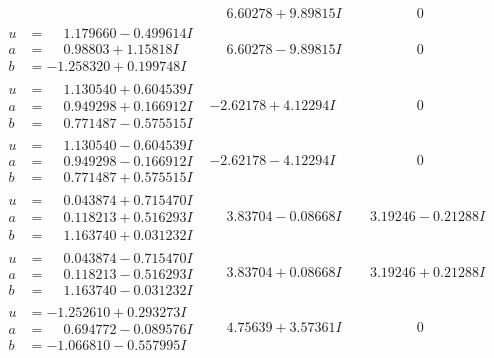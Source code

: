 \documentclass[1p]{elsarticle_modified}
\theoremstyle{definition}
\begin{document}
$$\begin{array}{c|c|c}
 & \phantom{-}6.60278 + 9.89815 I & \phantom{-0.000000 } 0 \\ \hline\begin{aligned}
u &= \phantom{-}1.179660 - 0.499614 I \\
a &= \phantom{-}0.98803 + 1.15818 I \\
b &= -1.258320 + 0.199748 I\end{aligned}
 & \phantom{-}6.60278 - 9.89815 I & \phantom{-0.000000 } 0 \\ \hline\begin{aligned}
u &= \phantom{-}1.130540 + 0.604539 I \\
a &= \phantom{-}0.949298 + 0.166912 I \\
b &= \phantom{-}0.771487 - 0.575515 I\end{aligned}
 & -2.62178 + 4.12294 I & \phantom{-0.000000 } 0 \\ \hline\begin{aligned}
u &= \phantom{-}1.130540 - 0.604539 I \\
a &= \phantom{-}0.949298 - 0.166912 I \\
b &= \phantom{-}0.771487 + 0.575515 I\end{aligned}
 & -2.62178 - 4.12294 I & \phantom{-0.000000 } 0 \\ \hline\begin{aligned}
u &= \phantom{-}0.043874 + 0.715470 I \\
a &= \phantom{-}0.118213 + 0.516293 I \\
b &= \phantom{-}1.163740 + 0.031232 I\end{aligned}
 & \phantom{-}3.83704 - 0.08668 I & \phantom{-}3.19246 - 0.21288 I \\ \hline\begin{aligned}
u &= \phantom{-}0.043874 - 0.715470 I \\
a &= \phantom{-}0.118213 - 0.516293 I \\
b &= \phantom{-}1.163740 - 0.031232 I\end{aligned}
 & \phantom{-}3.83704 + 0.08668 I & \phantom{-}3.19246 + 0.21288 I \\ \hline\begin{aligned}
u &= -1.252610 + 0.293273 I \\
a &= \phantom{-}0.694772 - 0.089576 I \\
b &= -1.066810 - 0.557995 I\end{aligned}
 & \phantom{-}4.75639 + 3.57361 I & \phantom{-0.000000 } 0 \\ \hline\begin{aligned}

\end{aligned}
\end{array}$$
\end{document}
